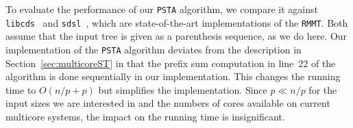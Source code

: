 To evaluate the performance of our {\tt PSTA} algorithm, we compare it against
{\tt libcds}~\cite{libcds} and {\tt sdsl}~\cite{sdsl}, which are
state-of-the-art implementations of the {\tt RMMT}.
Both assume that the input tree is given as a parenthesis sequence, as we do
here.
Our implementation of the {\tt PSTA} algorithm deviates from the description in
Section~\ref{sec:multicoreST} in that the prefix sum computation in
line~22 of the algorithm is done sequentially in our implementation.
This changes the running time to $O(n/p + p)$ but simplifies the implementation.
Since $p \ll n/p$ for the input sizes we are interested in and the numbers of
cores available on current multicore systems, the impact on the running
time is insignificant.
